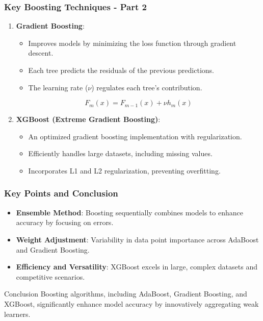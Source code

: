 \documentclass[aspectratio=169]{beamer}
\begin{document}
\begin{frame}[fragile]
    \frametitle{Key Boosting Techniques - Part 2}
    \begin{enumerate}[resume]
        \item \textbf{Gradient Boosting}:
        \begin{itemize}
            \item Improves models by minimizing the loss function through gradient descent.
            \item Each tree predicts the residuals of the previous predictions.
            \item The learning rate (\( \nu \)) regulates each tree's contribution.
        \end{itemize}
        \begin{equation}
            F_m(x) = F_{m-1}(x) + \nu h_m(x)
        \end{equation}

        \item \textbf{XGBoost (Extreme Gradient Boosting)}:
        \begin{itemize}
            \item An optimized gradient boosting implementation with regularization.
            \item Efficiently handles large datasets, including missing values.
            \item Incorporates L1 and L2 regularization, preventing overfitting.
        \end{itemize}
    \end{enumerate}
\end{frame}

\begin{frame}[fragile]
    \frametitle{Key Points and Conclusion}
    \begin{itemize}
        \item \textbf{Ensemble Method}: Boosting sequentially combines models to enhance accuracy by focusing on errors.
        \item \textbf{Weight Adjustment}: Variability in data point importance across AdaBoost and Gradient Boosting.
        \item \textbf{Efficiency and Versatility}: XGBoost excels in large, complex datasets and competitive scenarios.
    \end{itemize}

    \begin{block}{Conclusion}
        Boosting algorithms, including AdaBoost, Gradient Boosting, and XGBoost, significantly enhance model accuracy by innovatively aggregating weak learners.
    \end{block}
\end{frame}
\end{document}

